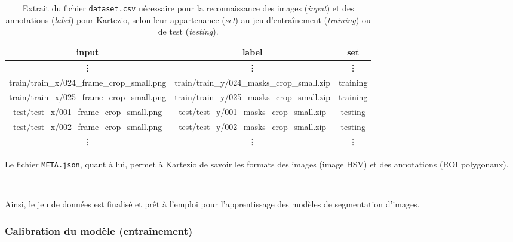 \documentclass[a4paper,12pt]{report}
\begin{document}
\begin{table}[!ht]
    \centering
    \renewcommand{\arraystretch}{1.2}
    \begin{tabular}{|c|c|c|}
        \hline
        input                                                    & label                                                    & set      \\\hline
        \vdots                                                   & \vdots                                                   & \vdots   \\
        {\scriptsize train/train\_x/024\_frame\_crop\_small.png} & {\scriptsize train/train\_y/024\_masks\_crop\_small.zip} & training \\
        {\scriptsize train/train\_x/025\_frame\_crop\_small.png} & {\scriptsize train/train\_y/025\_masks\_crop\_small.zip} & training \\
        {\scriptsize test/test\_x/001\_frame\_crop\_small.png}   & {\scriptsize test/test\_y/001\_masks\_crop\_small.zip}   & testing  \\
        {\scriptsize test/test\_x/002\_frame\_crop\_small.png}   & {\scriptsize test/test\_y/002\_masks\_crop\_small.zip}   & testing  \\
        \vdots                                                   & \vdots                                                   & \vdots   \\\hline
    \end{tabular}
    \caption{Extrait du fichier \texttt{dataset.csv} nécessaire pour la reconnaissance des images (\textit{input}) et des annotations (\textit{label}) pour Kartezio, selon leur appartenance (\textit{set}) au jeu d'entraînement (\textit{training}) ou de test (\textit{testing}).}
    \label{mac:dataset_csv}
\end{table}

Le fichier \texttt{META.json}, quant à lui, permet à Kartezio de savoir les formats des images (image HSV) et des annotations (ROI polygonaux).

\

Ainsi, le jeu de données est finalisé et prêt à l'emploi pour l'apprentissage des modèles de segmentation d'images.

\subsubsection{Calibration du modèle (entraînement)}
\end{document}
